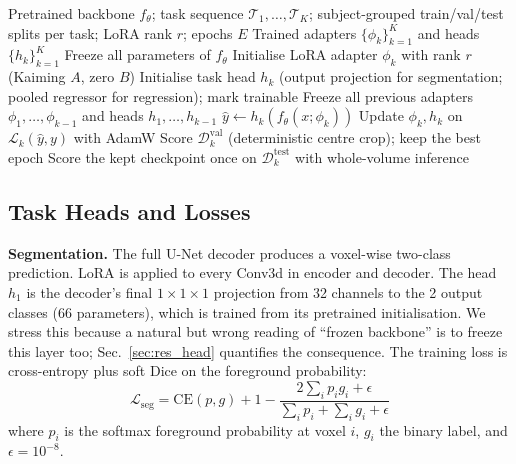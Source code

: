 \iffull\documentclass[journal]{IEEEtran}\else\documentclass[journal,twoside,web]{ieeecolor}\usepackage{generic}\fi
\begin{document}
\iffull  %
\begin{algorithm}[t]
\caption{Task-isolated adaptation of a frozen backbone (shown for LoRA)}
\label{alg:continual}
\begin{algorithmic}[1]
\REQUIRE Pretrained backbone $f_\theta$; task sequence $\mathcal{T}_1, \ldots, \mathcal{T}_K$; subject-grouped train/val/test splits per task; LoRA rank $r$; epochs $E$
\ENSURE Trained adapters $\{\phi_k\}_{k=1}^K$ and heads $\{h_k\}_{k=1}^K$
\STATE Freeze all parameters of $f_\theta$
    \STATE Initialise LoRA adapter $\phi_k$ with rank $r$ (Kaiming $A$, zero $B$)
    \STATE Initialise task head $h_k$ (output projection for segmentation; pooled regressor for regression); mark trainable
        \STATE Freeze all previous adapters $\phi_1, \ldots, \phi_{k-1}$ and heads $h_1, \ldots, h_{k-1}$
    \ENDIF
            \STATE $\hat{y} \leftarrow h_k(f_\theta(x; \phi_k))$
            \STATE Update $\phi_k, h_k$ on $\mathcal{L}_k(\hat{y}, y)$ with AdamW
        \ENDFOR
        \STATE Score $\mathcal{D}_k^{\text{val}}$ (deterministic centre crop); keep the best epoch
    \ENDFOR
    \STATE Score the kept checkpoint once on $\mathcal{D}_k^{\text{test}}$ with whole-volume inference
\ENDFOR
\end{algorithmic}
\end{algorithm}
\fi  %

\subsection{Task Heads and Losses}
\label{sec:heads}

\textbf{Segmentation.} The full U-Net decoder produces a voxel-wise two-class prediction. LoRA is applied to every Conv3d in encoder and decoder. The head $h_1$ is the decoder's final $1{\times}1{\times}1$ projection from 32 channels to the 2 output classes (66 parameters), which is trained from its pretrained initialisation. We stress this because a natural but wrong reading of ``frozen backbone'' is to freeze this layer too; Sec.~\ref{sec:res_head} quantifies the consequence. The training loss is cross-entropy plus soft Dice on the foreground probability:
\begin{equation}
\mathcal{L}_{\text{seg}} = \text{CE}(p, g) + 1 - \frac{2 \sum_i p_i g_i + \epsilon}{\sum_i p_i + \sum_i g_i + \epsilon}
\end{equation}
where $p_i$ is the softmax foreground probability at voxel $i$, $g_i$ the binary label, and $\epsilon=10^{-8}$.
\end{document}
